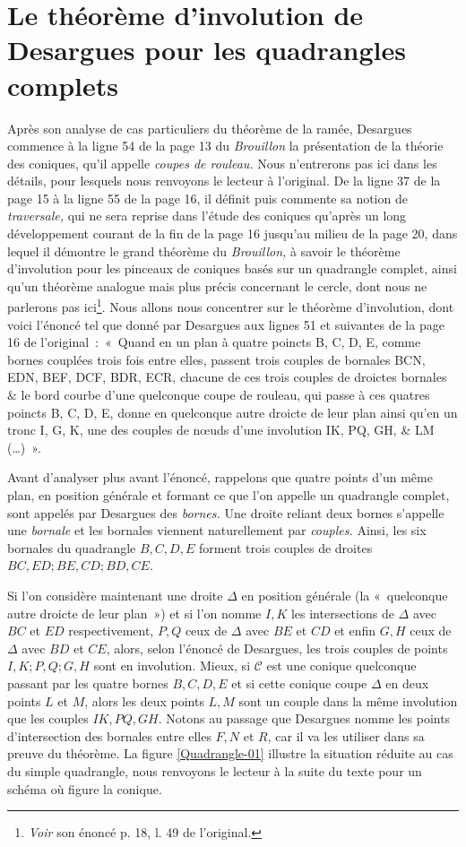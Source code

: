 \documentclass[12pt, a4paper]{article}
\newcommand{\cC}{\mathcal{C}}
\begin{document}
\section{Le théorème d'involution de Desargues pour les quadrangles complets}
Après son analyse de cas particuliers du théorème de la ramée, Desargues commence à la ligne 54 de la page 13 du \textit{Brouillon} la présentation de la théorie des coniques, qu'il appelle \emph{coupes de rouleau.} Nous n'entrerons pas ici dans les détails, pour lesquels nous renvoyons le lecteur à l'original. De la ligne 37 de la page 15 à la ligne 55 de la page 16, il définit puis commente sa notion de \textit{traversale,} qui ne sera reprise dans l'étude des coniques qu'après un long développement courant de la fin de la page 16 jusqu'au milieu de la page 20, dans lequel il démontre le grand théorème du \textit{Brouillon,} à savoir le théorème d'involution pour les pinceaux de coniques basés sur un quadrangle complet, ainsi qu'un théorème analogue mais plus précis concernant le cercle, dont nous ne parlerons pas ici\footnote{\textit{Voir} son énoncé p. 18, l. 49 de l'original.}. Nous allons nous concentrer sur le théorème d'involution, dont voici l'énoncé tel que donné par Desargues aux lignes 51 et suivantes de la page 16 de l'original~:~«~Quand en un plan à quatre poincts B, C, D, E, comme bornes couplées trois fois entre elles, passent trois couples de bornales BCN, EDN, BEF, DCF, BDR, ECR, chacune de ces trois couples de droictes bornales \& le bord courbe d'une quelconque coupe de rouleau, qui passe à ces quatres poincts B, C, D, E, donne en quelconque autre droicte de leur plan ainsi qu'en un tronc I, G, K, une des couples de n{\oe}uds d'une involution IK, PQ, GH, \& LM (\ldots)~».

Avant d'analyser plus avant l'énoncé, rappelons que quatre points d'un même plan, en position générale et formant ce que l'on appelle un quadrangle complet, sont appelés par Desargues des \textit{bornes.} Une droite reliant deux bornes s'appelle une \textit{bornale} et les bornales viennent naturellement par \textit{couples.} Ainsi, les six bornales du quadrangle $B,C,D,E$ forment trois couples de droites $BC,ED; BE,CD; BD, CE.$ 

Si l'on considère maintenant une droite $\Delta$ en position générale (la «~quelconque autre droicte de leur plan~») et si l'on nomme $I,K$ les intersections de $\Delta$ avec $BC$ et $ED$ respectivement, $P,Q$ ceux de $\Delta$ avec $BE$ et $CD$ et enfin $G,H$ ceux de $\Delta$ avec $BD$ et $CE$, alors, selon l'énoncé de Desargues, les trois couples de points $I,K;P,Q;G,H$ sont en involution. Mieux, si $\cC$ est une conique quelconque passant par les quatre bornes $B,C,D,E$ et si cette conique coupe $\Delta$ en deux points $L$ et $M$, alors les deux points $L,M$ sont un couple dans la même involution que les couples $IK, PQ, GH$. Notons au passage que Desargues nomme les points d'intersection des bornales entre elles $F,N$ et $R$, car il va les utiliser dans sa preuve du théorème. La figure \ref{Quadrangle-01} illustre la situation réduite au cas du simple quadrangle, nous renvoyons le lecteur à la suite du texte pour un schéma où figure la conique.
\end{document}
